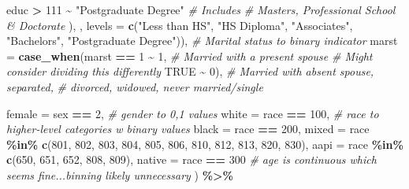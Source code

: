 \documentclass[
]{article}
\newenvironment{Shaded}{\begin{snugshade}}{\end{snugshade}}
\newcommand{\AttributeTok}[1]{\textcolor[rgb]{0.13,0.29,0.53}{#1}}
\newcommand{\CommentTok}[1]{\textcolor[rgb]{0.56,0.35,0.01}{\textit{#1}}}
\newcommand{\ConstantTok}[1]{\textcolor[rgb]{0.56,0.35,0.01}{#1}}
\newcommand{\DecValTok}[1]{\textcolor[rgb]{0.00,0.00,0.81}{#1}}
\newcommand{\FunctionTok}[1]{\textcolor[rgb]{0.13,0.29,0.53}{\textbf{#1}}}
\newcommand{\NormalTok}[1]{#1}
\newcommand{\SpecialCharTok}[1]{\textcolor[rgb]{0.81,0.36,0.00}{\textbf{#1}}}
\newcommand{\StringTok}[1]{\textcolor[rgb]{0.31,0.60,0.02}{#1}}
\begin{document}
\begin{Shaded}
\begin{Highlighting}[]
\NormalTok{                              educ }\SpecialCharTok{\textgreater{}} \DecValTok{111} \SpecialCharTok{\textasciitilde{}} \StringTok{"Postgraduate Degree"} \CommentTok{\# Includes }
                                  \CommentTok{\# Master\textquotesingle{}s, Professional School \& Doctorate}
\NormalTok{                              ), , }\AttributeTok{levels =} \FunctionTok{c}\NormalTok{(}\StringTok{"Less than HS"}\NormalTok{, }\StringTok{"HS Diploma"}\NormalTok{, }
                                              \StringTok{"Associate\textquotesingle{}s"}\NormalTok{, }\StringTok{"Bachelor\textquotesingle{}s"}\NormalTok{, }
                                              \StringTok{"Postgraduate Degree"}\NormalTok{)),}
         \CommentTok{\# Marital status to binary indicator}
         \AttributeTok{marst =} \FunctionTok{case\_when}\NormalTok{(marst }\SpecialCharTok{==} \DecValTok{1} \SpecialCharTok{\textasciitilde{}} \DecValTok{1}\NormalTok{, }\CommentTok{\# Married with a present spouse}
                           \CommentTok{\# Might consider dividing this differently}
                           \ConstantTok{TRUE} \SpecialCharTok{\textasciitilde{}} \DecValTok{0}\NormalTok{), }\CommentTok{\# Married with absent spouse, separated, }
                          \CommentTok{\# divorced, widowed, never married/single}
         
         \AttributeTok{female =}\NormalTok{ sex }\SpecialCharTok{==} \DecValTok{2}\NormalTok{, }\CommentTok{\# gender to 0,1 values}
         \AttributeTok{white =}\NormalTok{ race }\SpecialCharTok{==} \DecValTok{100}\NormalTok{, }\CommentTok{\# race to higher{-}level categories w binary values}
         \AttributeTok{black =}\NormalTok{ race }\SpecialCharTok{==} \DecValTok{200}\NormalTok{,}
         \AttributeTok{mixed =}\NormalTok{ race }\SpecialCharTok{\%in\%} \FunctionTok{c}\NormalTok{(}\DecValTok{801}\NormalTok{, }\DecValTok{802}\NormalTok{, }\DecValTok{803}\NormalTok{, }\DecValTok{804}\NormalTok{, }\DecValTok{805}\NormalTok{, }
                             \DecValTok{806}\NormalTok{, }\DecValTok{810}\NormalTok{, }\DecValTok{812}\NormalTok{, }\DecValTok{813}\NormalTok{, }\DecValTok{820}\NormalTok{, }\DecValTok{830}\NormalTok{),}
         \AttributeTok{aapi =}\NormalTok{ race }\SpecialCharTok{\%in\%} \FunctionTok{c}\NormalTok{(}\DecValTok{650}\NormalTok{, }\DecValTok{651}\NormalTok{, }\DecValTok{652}\NormalTok{, }\DecValTok{808}\NormalTok{, }\DecValTok{809}\NormalTok{),}
         \AttributeTok{native =}\NormalTok{ race }\SpecialCharTok{==} \DecValTok{300}
         \CommentTok{\# age is continuous which seems fine...binning likely unnecessary}
\NormalTok{         ) }\SpecialCharTok{\%\textgreater{}\%} 


\end{Highlighting}
\end{Shaded}
\end{document}
